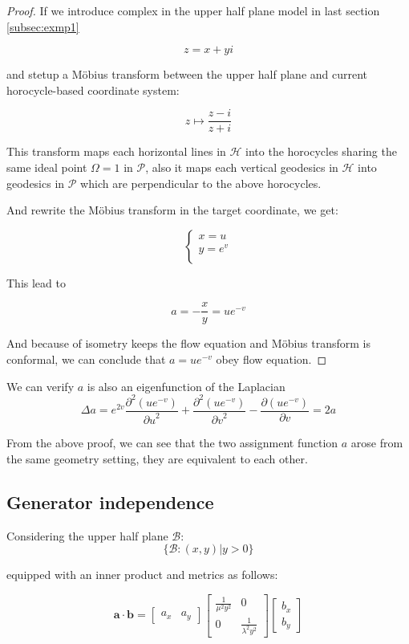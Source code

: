 \begin{proof}

If we introduce complex in the upper half plane model in last section \ref{subsec:exmp1}

$$
z = x + y i
$$

and stetup a Möbius transform between the upper half plane and current horocycle-based coordinate system:

$$
z \mapsto \frac{z-i}{z+i}
$$

This transform maps each horizontal lines in $\mathcal{H}$ into the horocycles sharing the same ideal point $\Omega = 1$ in $\mathcal{P}$,
also it maps each vertical geodesics in $\mathcal{H}$ into geodesics in $\mathcal{P}$ which are perpendicular to the above horocycles.

And rewrite the Möbius transform in the target coordinate, we get:

$$
\begin{cases}
x = u\\
y = e^v \\
\end{cases}
$$

This lead to

$$
a = -\frac{x}{y} = u e^{-v}
$$

And because of isometry keeps the flow equation and Möbius transform is conformal, we can conclude that $a = u e^{-v}$ obey flow equation.

\end{proof}

We can verify $a$ is also an eigenfunction of the Laplacian
$$
\Delta a = e^{2v} \frac{\partial^2(u e^{-v})}{{\partial u}^2} + \frac{\partial^2(u e^{-v})}{{\partial v}^2} - \frac{\partial(u e^{-v})}{\partial v} = 2a
$$

From the above proof, we can see that the two assignment function $a$ arose from the same geometry setting, they are equivalent to each other.

\subsection{Generator independence}

Considering the upper half plane $\mathcal{B}$:
$$
\{\mathcal{B}: (x, y) | y > 0 \}
$$

equipped with an inner product and metrics as follows:

$$
\mathbf{a} \cdot \mathbf{b} = \begin{bmatrix} a_x & a_y \end{bmatrix} \begin{bmatrix} \frac{1}{\mu^2 y^2} & 0 \\ 0 & \frac{1}{\lambda^2 y^2} \end{bmatrix} \begin{bmatrix} b_x \\ b_y \end{bmatrix}
$$

